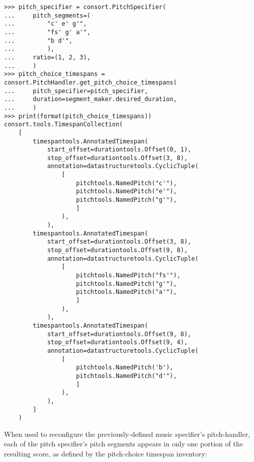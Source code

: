 \begin{abjadbookoutput}
\begin{singlespacing}
\vspace{-0.5\baselineskip}
\begin{verbatim}
>>> pitch_specifier = consort.PitchSpecifier(
...     pitch_segments=(
...         "c' e' g'",
...         "fs' g' a'",
...         "b d'",
...         ),
...     ratio=(1, 2, 3),
...     )
>>> pitch_choice_timespans = consort.PitchHandler.get_pitch_choice_timespans(
...     pitch_specifier=pitch_specifier,
...     duration=segment_maker.desired_duration,
...     )
>>> print(format(pitch_choice_timespans))
consort.tools.TimespanCollection(
    [
        timespantools.AnnotatedTimespan(
            start_offset=durationtools.Offset(0, 1),
            stop_offset=durationtools.Offset(3, 8),
            annotation=datastructuretools.CyclicTuple(
                [
                    pitchtools.NamedPitch("c'"),
                    pitchtools.NamedPitch("e'"),
                    pitchtools.NamedPitch("g'"),
                    ]
                ),
            ),
        timespantools.AnnotatedTimespan(
            start_offset=durationtools.Offset(3, 8),
            stop_offset=durationtools.Offset(9, 8),
            annotation=datastructuretools.CyclicTuple(
                [
                    pitchtools.NamedPitch("fs'"),
                    pitchtools.NamedPitch("g'"),
                    pitchtools.NamedPitch("a'"),
                    ]
                ),
            ),
        timespantools.AnnotatedTimespan(
            start_offset=durationtools.Offset(9, 8),
            stop_offset=durationtools.Offset(9, 4),
            annotation=datastructuretools.CyclicTuple(
                [
                    pitchtools.NamedPitch('b'),
                    pitchtools.NamedPitch("d'"),
                    ]
                ),
            ),
        ]
    )
\end{verbatim}
\end{singlespacing}
\end{abjadbookoutput}

\noindent When used to reconfigure the previously-defined music specifier's
pitch-handler, each of the pitch specifier's pitch segments appears in only one
portion of the resulting score, as defined by the pitch-choice timespan
inventory:

\begin{comment}
<abjad>[stylesheet=../consort.ily]
music_specifier = new(
    music_specifier,
    pitch_handler__pitch_specifier=pitch_specifier,
    )
music_setting = consort.MusicSetting(
    timespan_maker=timespan_maker,
    v1=music_specifier,
    v2=music_specifier,
    )
segment_maker = new(segment_maker, settings=[music_setting])
show(segment_maker, verbose=False)
</abjad>
\end{comment}

